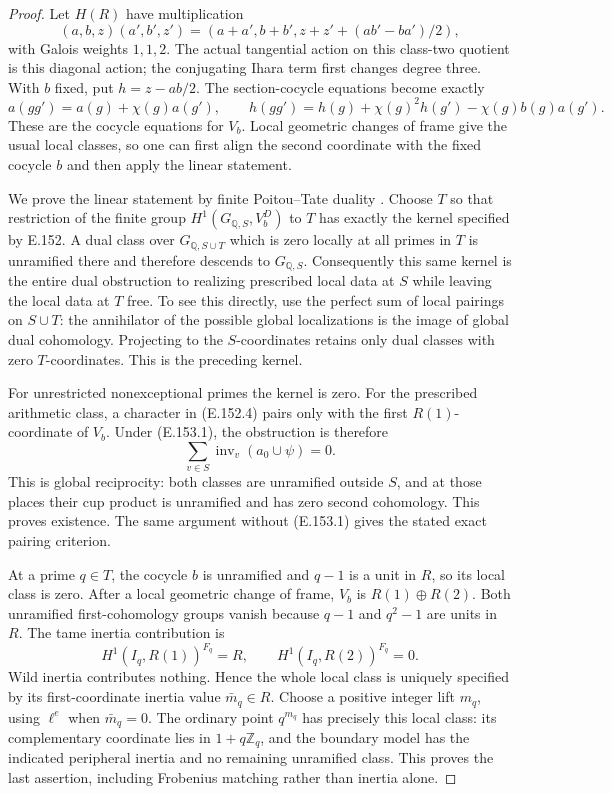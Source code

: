 \begin{proof}
Let \(H(R)\) have multiplication
\[
 (a,b,z)(a',b',z')=
 (a+a',b+b',z+z'+(ab'-ba')/2),
 \tag{E.153.2}
\]
with Galois weights \(1,1,2\). The actual tangential action on
this class-two quotient is this diagonal action; the conjugating
Ihara term first changes degree three. With \(b\) fixed, put
\(h=z-ab/2\). The section-cocycle equations become exactly
\[
 a(gg')=a(g)+\chi(g)a(g'),\qquad
 h(gg')=h(g)+\chi(g)^2h(g')-\chi(g)b(g)a(g').
 \tag{E.153.3}
\]
These are the cocycle equations for \(V_b\).
Local geometric changes of frame give the usual local classes,
so one can first align the second coordinate with the fixed
cocycle \(b\) and then apply the linear statement.

We prove the linear statement by finite Poitou--Tate duality
\citep[I.4.9--4.10, pp.~56--57]{CohMilneADT}.
Choose \(T\) so that restriction of the finite group
\(H^1(G_{\mathbb Q,S},V_b^D)\) to \(T\) has exactly the kernel
specified by E.152. A dual class over \(G_{\mathbb Q,S\cup T}\)
which is zero locally at all primes in \(T\) is unramified there
and therefore descends to \(G_{\mathbb Q,S}\).
Consequently this same kernel is the entire dual obstruction
to realizing prescribed local data at \(S\) while leaving the
local data at \(T\) free. To see this directly, use the perfect
sum of local pairings on \(S\cup T\): the annihilator of the
possible global localizations is the image of global dual
cohomology. Projecting to the \(S\)-coordinates retains only
dual classes with zero \(T\)-coordinates. This is the preceding
kernel.

For unrestricted nonexceptional primes the kernel is zero.
For the prescribed arithmetic class, a character in (E.152.4)
pairs only with the first \(R(1)\)-coordinate of \(V_b\).
Under (E.153.1), the obstruction is therefore
\[
       \sum_{v\in S}\operatorname{inv}_v(a_0\cup\psi)=0.
 \tag{E.153.4}
\]
This is global reciprocity: both classes are unramified outside
\(S\), and at those places their cup product is unramified and
has zero second cohomology. This proves existence. The same
argument without (E.153.1) gives the stated exact pairing
criterion.

At a prime \(q\in T\), the cocycle \(b\) is unramified and
\(q-1\) is a unit in \(R\), so its local class is zero.
After a local geometric change of frame, \(V_b\) is
\(R(1)\oplus R(2)\). Both unramified first-cohomology groups
vanish because \(q-1\) and \(q^2-1\) are units in \(R\).
The tame inertia contribution is
\[
 H^1(I_q,R(1))^{F_q}=R,
 \qquad H^1(I_q,R(2))^{F_q}=0.
 \tag{E.153.5}
\]
Wild inertia contributes nothing. Hence the whole local class
is uniquely specified by its first-coordinate inertia value
\(\bar m_q\in R\). Choose a positive integer lift \(m_q\),
using \(\ell^e\) when \(\bar m_q=0\). The ordinary point
\(q^{m_q}\) has precisely this local class: its complementary
coordinate lies in \(1+q\mathbb Z_q\), and the boundary model
has the indicated peripheral inertia and no remaining unramified
class. This proves the last assertion, including Frobenius
matching rather than inertia alone.
\end{proof}

